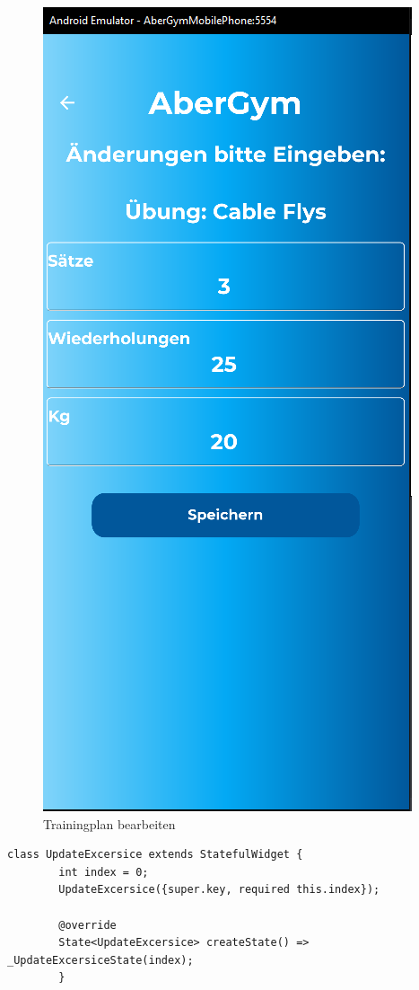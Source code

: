     \begin{figure}[H]
        \centering
        \includegraphics[scale=0.3]{pics/Bearbeiten.png}
        \caption{Trainingplan bearbeiten}
    \end{figure}

    \begin{lstlisting}[caption=Bearbeiten Index,label=lst:impl:frontend:qrcode]
        class UpdateExcersice extends StatefulWidget {
        int index = 0;
        UpdateExcersice({super.key, required this.index});
        
        @override
        State<UpdateExcersice> createState() => _UpdateExcersiceState(index);
        }
        \end{lstlisting}
        
